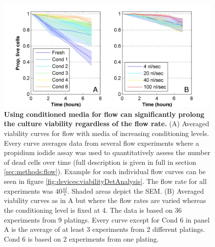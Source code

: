     \begin{figure}[h]
            \centering
            \includegraphics[width=15cm]{chapter4/figures/condImpression/condImpression.jpg}
            \caption[Effect of media conditioning and flow rate on viability of neuronal cultures under steady microfluidic flow]{\textbf{Using conditioned media for flow can significantly prolong the culture viability regardless of the flow rate.} (A) Averaged viability curves for flow with media of increasing conditioning levels. Every curve averages data from several flow experiments where a propidium iodide assay was used to quantitatively assess the number of dead cells over time (full description is given in full in section \ref{sec:methods:flow}). Example for such individual flow curves can be seen in figure \ref{fig:devices:viabilityDetAnalysis}. The flow rate for all experiments was \(40\frac{nl}{s}\). Shaded areas depict the SEM. (B) Averaged viability curves as in A but where the flow rates are varied whereas the conditioning level is fixed at 4. The data is based on 36 experiments from 9 platings. Every curve except for Cond 6 in panel A is the average of at least 3 experiments from 2 different platings. Cond 6 is based on 2 experiments from one plating.}
            \label{fig:devices:viabilityImpression}

    \end{figure}


